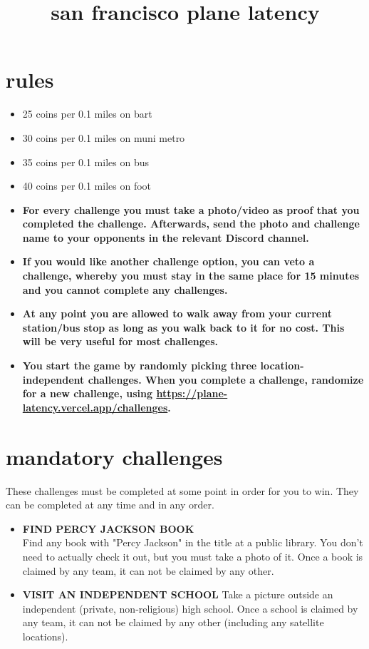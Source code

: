 \documentclass{article}
\title{san francisco plane latency}
\author{}
\date{}
\begin{document}
\maketitle

\section{rules}
\begin{itemize}
    \item 25 coins per 0.1 miles on bart
    \item 30 coins per 0.1 miles on muni metro
    \item 35 coins per 0.1 miles on bus
    \item 40 coins per 0.1 miles on foot
    \item \textbf{For every challenge you must take a photo/video as proof that you completed the challenge. Afterwards, send the photo and challenge name to your opponents in the relevant Discord channel.}
    \item \textbf{If you would like another challenge option, you can veto a challenge, whereby you must stay in the same place for 15 minutes and you cannot complete any challenges.}
    \item \textbf{At any point you are allowed to walk away from your current station/bus stop as long as you walk back to it for no cost. This will be very useful for most challenges.}
    \item \textbf{You start the game by randomly picking three location-independent challenges. When you complete a challenge, randomize for a new challenge, using \url{https://plane-latency.vercel.app/challenges}.}
\end{itemize}

\section{mandatory challenges}
These challenges must be completed at some point in order for you to win. They can be completed at any time and in any order.
\begin{itemize}
    \item \textbf{FIND PERCY JACKSON BOOK} \\
        Find any book with "Percy Jackson" in the title at a public library. You don't need to actually check it out, but you must take a photo of it. Once a book is claimed by any team, it can not be claimed by any other.
    \item \textbf{VISIT AN INDEPENDENT SCHOOL}
        Take a picture outside an independent (private, non-religious) high school. Once a school is claimed by any team, it can not be claimed by any other (including any satellite locations).
\end{itemize}
\end{document}
